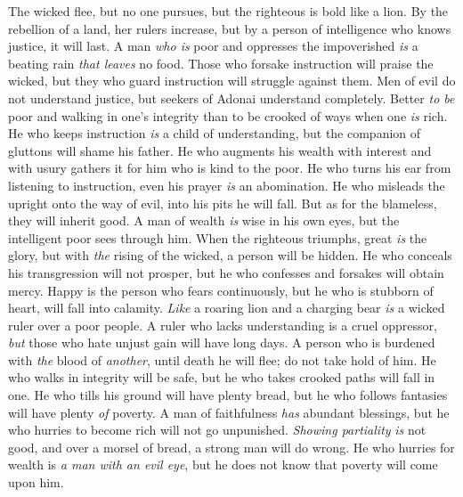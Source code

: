 \begin{biblechapter} %
\verse The wicked flee, but no one pursues, 
but the righteous is bold like a lion.
\verse By the rebellion of a land, her rulers increase, 
but by a person of intelligence who knows justice, it will last.
\verse A man \textit{who is} poor and oppresses the impoverished 
\textit{is} a beating rain \textit{that leaves} no food.
\verse Those who forsake instruction will praise the wicked, 
but they who guard instruction will struggle against them.
\verse Men of evil do not understand justice, 
but seekers of Adonai understand completely.
\verse Better \textit{to be} poor and walking in one’s integrity 
than to be crooked of ways when one \textit{is} rich.
\verse He who keeps instruction \textit{is} a child of understanding, 
but the companion of gluttons will shame his father.
\verse He who augments his wealth with interest and with usury 
gathers it for him who is kind to the poor.
\verse He who turns his ear from listening to instruction, 
even his prayer \textit{is} an abomination.
\verse He who misleads the upright onto the way of evil, 
into his pits he will fall. 
But as for the blameless, they will inherit good.
\verse A man of wealth \textit{is} wise in his own eyes, 
but the intelligent poor sees through him.
\verse When the righteous triumphs, great \textit{is} the glory, 
but with \textit{the} rising of the wicked, a person will be hidden.
\verse He who conceals his transgression will not prosper, 
but he who confesses and forsakes will obtain mercy.
\verse Happy is the person who fears continuously, 
but he who is stubborn of heart, will fall into calamity.
\verse \textit{Like} a roaring lion and a charging bear 
\textit{is} a wicked ruler over a poor people.
\verse A ruler who lacks understanding is a cruel oppressor, 
\textit{but} those who hate unjust gain will have long days.
\verse A person who is burdened with \textit{the} blood of \textit{another}, 
until death he will flee; 
do not take hold of him.
\verse He who walks in integrity will be safe, 
but he who takes crooked paths will fall in one.
\verse He who tills his ground will have plenty bread, 
but he who follows fantasies will have plenty \textit{of} poverty.
\verse A man of faithfulness \textit{has} abundant blessings, 
but he who hurries to become rich will not go unpunished.
\verse \textit{Showing partiality} \textit{is} not good, 
and over a morsel of bread, a strong man will do wrong.
\verse He who hurries for wealth is \textit{a man with an evil eye}, 
but he does not know that poverty will come upon him.

\end{biblechapter}

